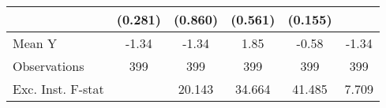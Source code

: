 {\begin{tabular}{l*{5}{c}}
            &     (0.281)         &     (0.860)         &     (0.561)         &     (0.155)         &                     \\
\midrule
Mean Y      &       -1.34         &       -1.34         &        1.85         &       -0.58         &       -1.34         \\
Observations&         399         &         399         &         399         &         399         &         399         \\
Exc. Inst. F-stat&                     &      20.143         &      34.664         &      41.485         &       7.709         \\
\bottomrule
\end{tabular}
}
